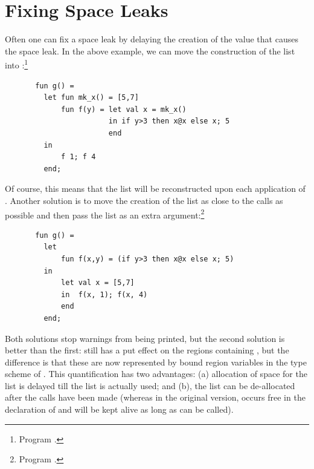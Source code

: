 \documentclass[12pt]{book}
\begin{document}
\section{Fixing Space Leaks}
Often one can fix a space leak by delaying the creation of the
 value that causes the space leak. In the above example,
we can move the construction of the list into :\footnote{Program .}
\begin{verbatim}
       fun g() = 
         let fun mk_x() = [5,7]
             fun f(y) = let val x = mk_x()
                        in if y>3 then x@x else x; 5 
                        end
         in 
             f 1; f 4
         end;
\end{verbatim}
Of course, this means that the list will be reconstructed upon each application
of . Another solution is to move the creation of the list as close to 
the calls as possible and then pass the list as an extra argument:\footnote{Program .}
\begin{verbatim}
       fun g() = 
         let 
             fun f(x,y) = (if y>3 then x@x else x; 5)
         in 
             let val x = [5,7]
             in  f(x, 1); f(x, 4)
             end
         end;
\end{verbatim}
Both solutions stop warnings from being printed, 
but the second solution is better than the first:  still has a
put effect on the regions containing , but the difference
is that these are now represented by bound region variables in the type scheme of
. This quantification has two advantages: (a) allocation of space for the list is
delayed till the list is actually used; and (b), the list can be de-allocated
after the calls have been made (whereas in the original version,  occurs
free in the declaration of  and will be kept alive as long as  can be called).
\end{document}
